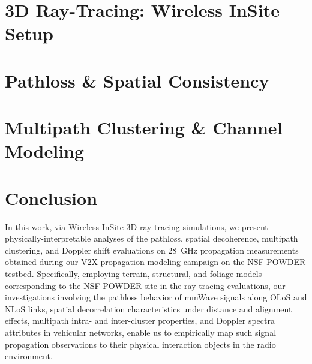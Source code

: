 \documentclass[10pt, twocolumn]{IEEEtran}
\begin{document}
\section{3D Ray-Tracing: Wireless InSite Setup}\label{S3}

\section{Pathloss \& Spatial Consistency}\label{S4}

\section{Multipath Clustering \& Channel Modeling}\label{S5}

\balance
\section{Conclusion}\label{S6}
In this work, via Wireless InSite $3$D ray-tracing simulations, we present physically-interpretable analyses of the pathloss, spatial decoherence, multipath clustering, and Doppler shift evaluations on \SI{28}{\giga\hertz} propagation measurements obtained during our V$2$X propagation modeling campaign on the NSF POWDER testbed. Specifically, employing terrain, structural, and foliage models corresponding to the NSF POWDER site in the ray-tracing evaluations, our investigations involving the pathloss behavior of mmWave signals along OLoS and NLoS links, spatial decorrelation characteristics under distance and alignment effects, multipath intra- and inter-cluster properties, and Doppler spectra attributes in vehicular networks, enable us to empirically map such signal propagation observations to their physical interaction objects in the radio environment.
\vspace{-3mm}

\balance

 
\end{document}
